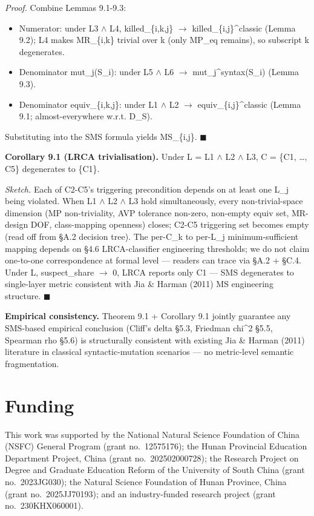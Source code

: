 \documentclass[review,12pt,authoryear]{elsarticle}
\providecommand{\tightlist}{\setlength{\itemsep}{0pt}\setlength{\parskip}{0pt}}
\begin{document}
\emph{Proof.} Combine Lemmas 9.1-9.3:

\begin{itemize}
\tightlist
\item
  Numerator: under L3 $\wedge$ L4, killed\_\{i,k,j\} $\to$
  killed\_\{i,j\}\^{}classic (Lemma 9.2); L4 makes MR\_\{i,k\} trivial
  over k (only MP\_eq remains), so subscript k degenerates.
\item
  Denominator \textbar mut\_j(S\_i)\textbar: under L5 $\wedge$ L6 $\to$
  \textbar mut\_j\^{}syntax(S\_i)\textbar{} (Lemma 9.3).
\item
  Denominator \textbar equiv\_\{i,k,j\}\textbar: under L1 $\wedge$ L2 $\to$
  \textbar equiv\_\{i,j\}\^{}classic\textbar{} (Lemma 9.1;
  almost-everywhere w.r.t. D\_S).
\end{itemize}

Substituting into the SMS formula yields MS\_\{i,j\}. $\blacksquare$

\textbf{Corollary 9.1 (LRCA trivialisation).} Under L = L1 $\wedge$ L2 $\wedge$ L3, C
= \{C1, \ldots, C5\} degenerates to \{C1\}.

\emph{Sketch.} Each of C2-C5's triggering precondition depends on at
least one L\_j being violated. When L1 $\wedge$ L2 $\wedge$ L3 hold simultaneously,
every non-trivial-space dimension (MP non-triviality, AVP tolerance
non-zero, non-empty equiv set, MR-design DOF, class-mapping openness)
closes; C2-C5 triggering set becomes empty (read off from §A.2 decision
tree). The per-C\_k to per-L\_j minimum-sufficient mapping depends on
§4.6 LRCA-classifier engineering thresholds; we do not claim one-to-one
correspondence at formal level --- readers can trace via §A.2 + §C.4.
Under L, suspect\_share $\to$ 0, LRCA reports only C1 --- SMS degenerates to
single-layer metric consistent with Jia \& Harman (2011) MS engineering
structure. $\blacksquare$

\textbf{Empirical consistency.} Theorem 9.1 + Corollary 9.1 jointly
guarantee any SMS-based empirical conclusion (Cliff's delta §5.3,
Friedman chi\^{}2 §5.5, Spearman rho §5.6) is structurally consistent
with existing Jia \& Harman (2011) literature in classical
syntactic-mutation scenarios --- no metric-level semantic fragmentation.

\section*{Funding}

This work was supported by the National Natural Science Foundation of China (NSFC) General Program (grant no.\ 12575176); the Hunan Provincial Education Department Project, China (grant no.\ 202502000728); the Research Project on Degree and Graduate Education Reform of the University of South China (grant no.\ 2023JG030); the Natural Science Foundation of Hunan Province, China (grant no.\ 2025JJ70193); and an industry-funded research project (grant no.\ 230KHX060001).
\end{document}
